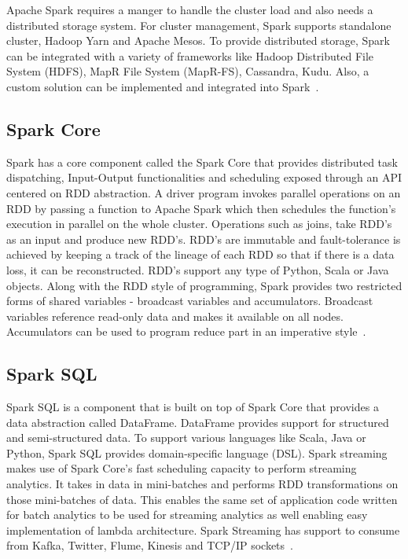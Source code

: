 Apache Spark requires  a manger to handle the cluster load and also needs a 
distributed storage system. For cluster management, Spark supports standalone 
cluster, Hadoop Yarn and Apache Mesos. To provide distributed storage, Spark 
can be integrated with a variety of frameworks like Hadoop Distributed File 
System (HDFS), MapR File System (MapR-FS), Cassandra, Kudu. Also, a custom 
solution can be implemented and integrated into Spark~\cite{hid-sp18-408-Spark}. 

\subsection{Spark Core}
Spark has a core component called the Spark Core that provides distributed task 
dispatching, Input-Output functionalities and scheduling exposed through an API 
centered on RDD abstraction. A driver program invokes parallel operations on an 
RDD by passing a function to Apache Spark which then schedules the function's 
execution in parallel on the whole cluster. Operations such as joins, take RDD's 
as an input and produce new RDD's. RDD's are immutable and fault-tolerance is 
achieved by keeping a track of the lineage of each RDD so that if there is a 
data loss, it can be reconstructed. RDD's support any type of Python, Scala or 
Java objects. Along with the RDD style of programming, Spark provides two 
restricted forms of shared variables - broadcast variables and accumulators. 
Broadcast variables reference read-only data and makes it available on all 
nodes. Accumulators can be used to program reduce part in an imperative style~\cite{hid-sp18-408-Spark}. 

\subsection{Spark SQL}
Spark SQL is a component that is built on top of Spark Core that provides a data 
abstraction called DataFrame. DataFrame provides support for structured and 
semi-structured data. To support various languages like Scala, Java or Python, 
Spark SQL provides domain-specific language (DSL). Spark streaming makes use of 
Spark Core's fast scheduling capacity to perform streaming analytics. It takes
in data in mini-batches and performs RDD transformations on those mini-batches 
of data. This enables the same set of application code written for batch 
analytics to be used for streaming analytics as well enabling easy 
implementation of lambda architecture. Spark Streaming has support to consume 
from Kafka, Twitter, Flume, Kinesis and TCP/IP sockets~\cite{hid-sp18-408-Spark}.

